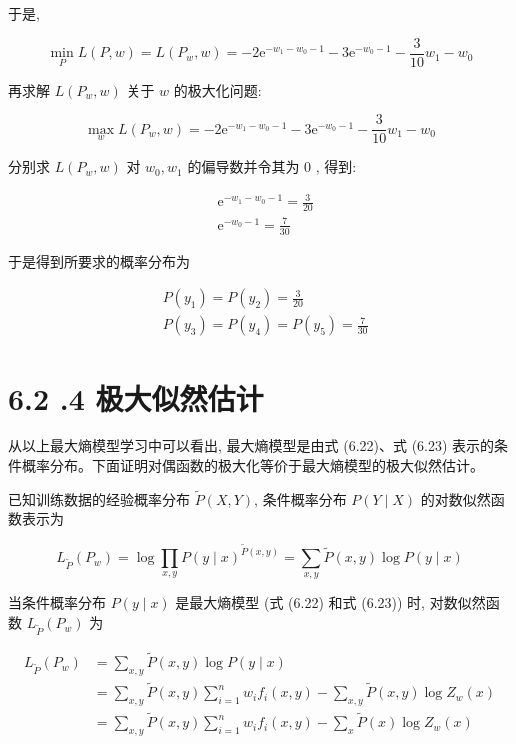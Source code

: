 \documentclass[10pt]{article}
\begin{document}
\begin{CJK*}{UTF8}{bsmi}
于是,

$$
\min _{P} L(P, w)=L\left(P_{w}, w\right)=-2 \mathrm{e}^{-w_{1}-w_{0}-1}-3 \mathrm{e}^{-w_{0}-1}-\frac{3}{10} w_{1}-w_{0}
$$

再求解 $L\left(P_{w}, w\right)$ 关于 $w$ 的极大化问题:

$$
\max _{w} L\left(P_{w}, w\right)=-2 \mathrm{e}^{-w_{1}-w_{0}-1}-3 \mathrm{e}^{-w_{0}-1}-\frac{3}{10} w_{1}-w_{0}
$$

分别求 $L\left(P_{w}, w\right)$ 对 $w_{0}, w_{1}$ 的偏导数并令其为 0 , 得到:

$$
\begin{aligned}
& \mathrm{e}^{-w_{1}-w_{0}-1}=\frac{3}{20} \\
& \mathrm{e}^{-w_{0}-1}=\frac{7}{30}
\end{aligned}
$$

于是得到所要求的概率分布为

$$
\begin{aligned}
& P\left(y_{1}\right)=P\left(y_{2}\right)=\frac{3}{20} \\
& P\left(y_{3}\right)=P\left(y_{4}\right)=P\left(y_{5}\right)=\frac{7}{30}
\end{aligned}
$$

\section*{6.2 .4 极大似然估计}
从以上最大熵模型学习中可以看出, 最大熵模型是由式 (6.22)、式 (6.23) 表示的条件概率分布。下面证明对偶函数的极大化等价于最大熵模型的极大似然估计。

已知训练数据的经验概率分布 $\tilde{P}(X, Y)$, 条件概率分布 $P(Y \mid X)$ 的对数似然函数表示为

$$
L_{\tilde{P}}\left(P_{w}\right)=\log \prod_{x, y} P(y \mid x)^{\tilde{P}(x, y)}=\sum_{x, y} \tilde{P}(x, y) \log P(y \mid x)
$$

当条件概率分布 $P(y \mid x)$ 是最大熵模型 (式 (6.22) 和式 (6.23)) 时, 对数似然函数 $L_{\tilde{P}}\left(P_{w}\right)$ 为


\begin{align*}
L_{\tilde{P}}\left(P_{w}\right) & =\sum_{x, y} \tilde{P}(x, y) \log P(y \mid x) \\
& =\sum_{x, y} \tilde{P}(x, y) \sum_{i=1}^{n} w_{i} f_{i}(x, y)-\sum_{x, y} \tilde{P}(x, y) \log Z_{w}(x) \\
& =\sum_{x, y} \tilde{P}(x, y) \sum_{i=1}^{n} w_{i} f_{i}(x, y)-\sum_{x} \tilde{P}(x) \log Z_{w}(x) \tag{6.26}
\end{align*}



\end{CJK*}
\end{document}
